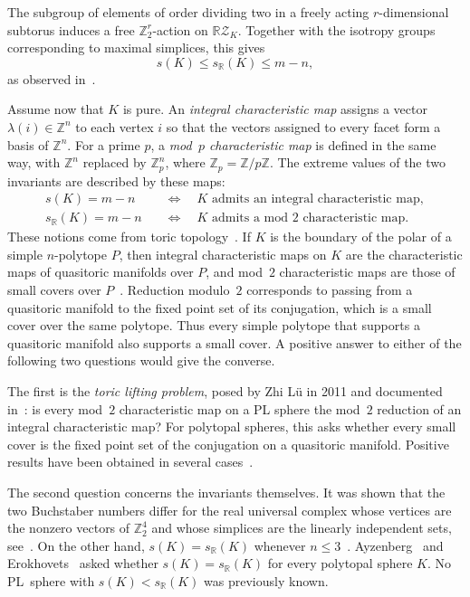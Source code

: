 \documentclass[10pt,a4paper]{amsart}
\theoremstyle{plain}
\numberwithin{equation}{section}
\theoremstyle{remark}
\theoremstyle{definition}
\newcommand{\Z}{\mathbb Z}
\newcommand{\RZ}{\mathbb R \mathcal Z}
\newcommand{\R}{\mathbb R}
\begin{document}
The subgroup of elements of order dividing two in a freely acting $r$-dimensional subtorus induces a free $\Z_2^r$-action on $\RZ_K$. 
Together with the isotropy groups corresponding to maximal simplices, this gives
$$
    s(K)\le s_{\R}(K)\le m-n,
$$
as observed in~\cite{Fukukawa-Masuda2011}.

Assume now that $K$ is pure.
An \emph{integral characteristic map} assigns a vector~$\lambda(i)\in\Z^n$ to each vertex $i$ so that the vectors assigned to every facet form a basis of $\Z^n$. 
For a prime $p$, a \emph{mod~$p$ characteristic map} is defined in the same way, with $\Z^n$ replaced by $\Z_p^n$, where $\Z_p=\Z/p\Z$.
The extreme values of the two invariants are described by these maps:
\begin{align*}
    s(K)=m-n &\quad\Longleftrightarrow\quad K\text{ admits an integral characteristic map},\\
    s_{\R}(K)=m-n &\quad\Longleftrightarrow\quad K\text{ admits a mod }2\text{ characteristic map}.  
\end{align*}
These notions come from toric topology~\cite{Davis-Januszkiewicz1991, Ishida-Fukukawa-Masuda2013, Buchstaber-Panov2015book}.
If $K$ is the boundary of the polar of a simple $n$-polytope $P$, then integral characteristic maps on $K$ are the characteristic maps of quasitoric manifolds over $P$, and mod~$2$ characteristic maps are those of small covers over $P$~\cite{Davis-Januszkiewicz1991}. 
Reduction modulo~$2$ corresponds to passing from a quasitoric manifold to the fixed point set of its conjugation, which is a small cover over the same polytope. 
Thus every simple polytope that supports a quasitoric manifold also supports a small cover. 
A positive answer to either of the following two questions would give the converse.

The first is the \emph{toric lifting problem}, posed by Zhi L\"u in 2011 and documented in~\cite{Choi-Park2016Wedge}: is every mod~$2$ characteristic map on a PL sphere the mod~$2$ reduction of an integral characteristic map? 
For polytopal spheres, this asks whether every small cover is the fixed point set of the conjugation on a quasitoric manifold. 
Positive results have been obtained in several cases~\cite{Choi-Jang-Vallee2025JLMS, Choi-Guan-Jang-Lu2026}. 

The second question concerns the invariants themselves. 
It was shown that the two Buchstaber numbers differ for the real universal complex whose vertices are the nonzero vectors of $\Z_2^4$ and whose simplices are the linearly independent sets, see~\cite{Ayzenberg2014preprint,Sun2017}. 
On the other hand, $s(K)=s_\R(K)$ whenever $n\le3$~\cite[Proposition~3.2.35]{Erokhovets2014}. 
Ayzenberg~\cite[Problem~1]{Ayzenberg2014preprint} and Erokhovets~\cite[Problem~3.2.39]{Erokhovets2014} asked whether $s(K)=s_\R(K)$ for every polytopal sphere $K$. 
No PL~sphere with $s(K) < s_\R(K)$ was previously known.
\end{document}
